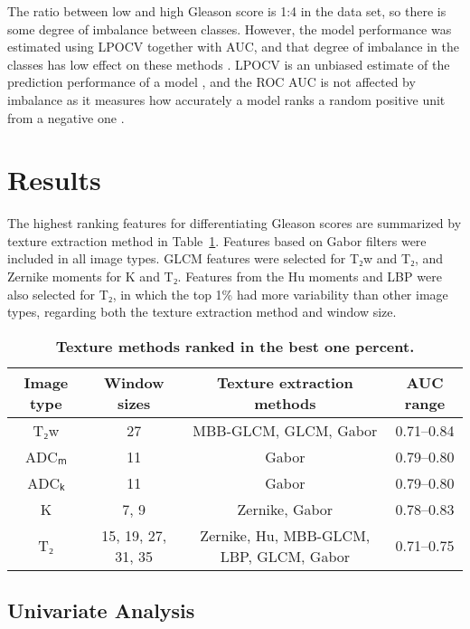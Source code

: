 \documentclass[10pt,letterpaper]{article}
\newcommand{\citep}{\cite}
\begin{document}
The ratio between low and high Gleason score is 1:4 in the data set, so there is
some degree of imbalance between classes. However, the model performance was
estimated using LPOCV together with AUC, and that degree of imbalance in the
classes has low effect on these methods \citep{Airola2011, Smith2014}. LPOCV is
an unbiased estimate of the prediction performance of a model
\citep{Airola2011}, and the ROC AUC is not affected by imbalance as it measures
how accurately a model ranks a random positive unit from a negative one
\citep{Fawcett2006}.

%
\newpage
\section{Results}

The highest ranking features for differentiating Gleason scores are summarized
by texture extraction method in Table~\ref{tab:texture_best1p}. Features based
on Gabor filters were included in all image types. GLCM features were selected
for T₂w and T₂, and Zernike moments for K and T₂. Features from the Hu
moments and LBP were also selected for T₂, in which the top 1\% had more
variability than other image types, regarding both the texture extraction method
and window size.

\begin{table}[!h]
\begin{adjustwidth}{-2.25in}{0in}
\centering
\caption{{\bf Texture methods ranked in the best one percent.}}%
\label{tab:texture_best1p}

\begin{tabular}{c c c c}
\hline
Image type & Window sizes & Texture extraction methods & AUC range \\
\hline
T₂w & 27 & MBB-GLCM, GLCM, Gabor & 0.71--0.84 \\
ADCₘ & 11 & Gabor & 0.79--0.80 \\
ADCₖ & 11 & Gabor & 0.79--0.80 \\
K & 7, 9 & Zernike, Gabor & 0.78--0.83 \\
T₂ & 15, 19, 27, 31, 35 & Zernike, Hu, MBB-GLCM, LBP, GLCM, Gabor & 0.71--0.75 \\
\hline
\end{tabular}
\end{adjustwidth}
\end{table}


\subsection{Univariate Analysis}
\end{document}
